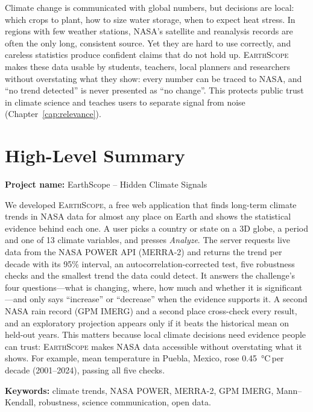 \documentclass[12pt, oneside, openany]{report}
\newcommand{\EarthScope}{\textsc{EarthScope}}
\newcommand{\perdecade}{\,per decade}
\begin{document}
{
Climate change is communicated with global numbers, but decisions are local: which crops to plant, how to size water storage, when to expect heat stress. In regions with few weather stations, NASA's satellite and reanalysis records are often the only long, consistent source. Yet they are hard to use correctly, and careless statistics produce confident claims that do not hold up. \EarthScope{} makes these data usable by students, teachers, local planners and researchers without overstating what they show: every number can be traced to NASA, and \enquote{no trend detected} is never presented as \enquote{no change}. This protects public trust in climate science and teaches users to separate signal from noise (Chapter~\ref{cap:relevance}).
\par}

\chapter*{High-Level Summary}

\noindent\textbf{Project name:} EarthScope -- Hidden Climate Signals

\vspace{0.3cm}
We developed \EarthScope{}, a free web application that finds long-term climate trends in NASA data for almost any place on Earth and shows the statistical evidence behind each one. A user picks a country or state on a 3D globe, a period and one of 13 climate variables, and presses \emph{Analyze}. The server requests live data from the NASA POWER API (MERRA-2) and returns the trend per decade with its 95\% interval, an autocorrelation-corrected test, five robustness checks and the smallest trend the data could detect. It answers the challenge's four questions---what is changing, where, how much and whether it is significant---and only says \enquote{increase} or \enquote{decrease} when the evidence supports it. A second NASA rain record (GPM IMERG) and a second place cross-check every result, and an exploratory projection appears only if it beats the historical mean on held-out years. This matters because local climate decisions need evidence people can trust: \EarthScope{} makes NASA data accessible without overstating what it shows. For example, mean temperature in Puebla, Mexico, rose \SI{+0.45}{\celsius}\perdecade{} (2001--2024), passing all five checks.

\vspace{0.4cm}
\noindent\textbf{Keywords:} climate trends, NASA POWER, MERRA-2, GPM IMERG, Mann--Kendall, robustness, science communication, open data.
\end{document}
